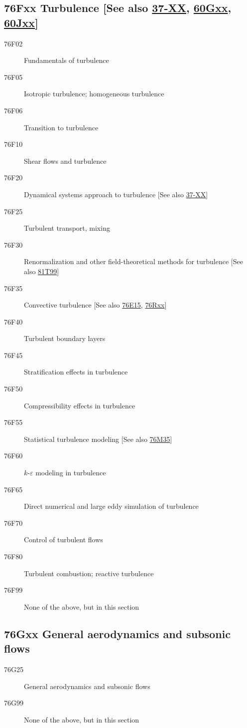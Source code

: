 \documentclass[letterpaper]{article}
\begin{document}
\subsection*{76Fxx  Turbulence [See also \hyperref[37-XX]{37-XX}, \hyperref[60Gxx]{60Gxx}, \hyperref[60Jxx]{60Jxx}] }\label{76Fxx}
\begin{description} 
\item [76F02]\label{76F02} Fundamentals of turbulence
\item [76F05]\label{76F05} Isotropic turbulence; homogeneous turbulence
\item [76F06]\label{76F06} Transition to turbulence
\item [76F10]\label{76F10} Shear flows and turbulence
\item [76F20]\label{76F20} Dynamical systems approach to turbulence [See also \hyperref[37-XX]{37-XX}]
\item [76F25]\label{76F25} Turbulent transport, mixing
\item [76F30]\label{76F30} Renormalization and other field-theoretical methods for turbulence [See also \hyperref[81T99]{81T99}]
\item [76F35]\label{76F35} Convective turbulence [See also \hyperref[76E15]{76E15}, \hyperref[76Rxx]{76Rxx}]
\item [76F40]\label{76F40} Turbulent boundary layers
\item [76F45]\label{76F45} Stratification effects in turbulence
\item [76F50]\label{76F50} Compressibility effects in turbulence
\item [76F55]\label{76F55} Statistical turbulence modeling [See also \hyperref[76M35]{76M35}]
\item [76F60]\label{76F60} $k$-$\varepsilon$ modeling in turbulence
\item [76F65]\label{76F65} Direct numerical and large eddy simulation of turbulence
\item [76F70]\label{76F70} Control of turbulent flows
\item [76F80]\label{76F80} Turbulent combustion; reactive turbulence
\item [76F99]\label{76F99} None of the above, but in this section
\end{description}
\subsection*{76Gxx  General aerodynamics and subsonic flows }\label{76Gxx}
\begin{description}  
\item [76G25]\label{76G25} General aerodynamics and subsonic flows
\item [76G99]\label{76G99} None of the above, but in this section
\end{description}
\end{document}
